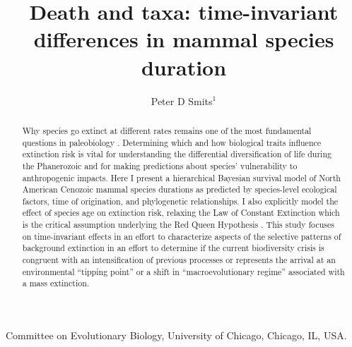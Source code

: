 \documentclass{nature}
\title{Death and taxa: time-invariant differences in mammal species duration}
\author{Peter D Smits$^{1}$}
\begin{document}
\maketitle

\begin{affiliations}
\item Committee on Evolutionary Biology, University of Chicago, Chicago, IL, USA.
\end{affiliations}

\begin{abstract}
  Why species go extinct at different rates remains one of the most fundamental questions in paleobiology \cite{Simpson1944,VanValen1973,Raup1994,Quental2013,Wagner2014b}. Determining which and how biological traits influence extinction risk is vital for understanding the differential diversification of life during the Phanerozoic and for making predictions about species' vulnerability to anthropogenic impacts. Here I present a hierarchical Bayesian survival model of North American Cenozoic mammal species durations as predicted by species-level ecological factors, time of origination, and phylogenetic relationships. I also explicitly model the effect of species age on extinction risk, relaxing the Law of Constant Extinction which is the critical assumption underlying the Red Queen Hypothesis \cite{VanValen1973}. 
  This study focuses on time-invariant effects in an effort to characterize aspects of the selective patterns of background extinction in an effort to determine if the current biodiversity crisis is congruent with an intensification of previous processes or represents the arrival at an environmental ``tipping point'' \cite{Barnosky2011,Barnosky2012a} or a shift in ``macroevolutionary regime'' \cite{Jablonski1986} associated with a mass extinction.
\end{abstract}
\end{document}
